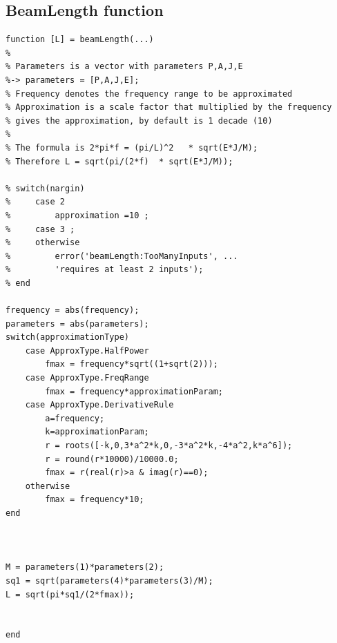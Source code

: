 \documentclass[10pt,a4paper,final]{report}
\begin{document}
\subsection{BeamLength function}

\begin{lstlisting}
function [L] = beamLength(...)
%
% Parameters is a vector with parameters P,A,J,E 
%-> parameters = [P,A,J,E];
% Frequency denotes the frequency range to be approximated
% Approximation is a scale factor that multiplied by the frequency
% gives the approximation, by default is 1 decade (10)
%
% The formula is 2*pi*f = (pi/L)^2   * sqrt(E*J/M);
% Therefore L = sqrt(pi/(2*f)  * sqrt(E*J/M));

% switch(nargin)
%     case 2
%         approximation =10 ;
%     case 3 ;
%     otherwise
%         error('beamLength:TooManyInputs', ...
%         'requires at least 2 inputs');
% end

frequency = abs(frequency);
parameters = abs(parameters);
switch(approximationType)
    case ApproxType.HalfPower
        fmax = frequency*sqrt((1+sqrt(2)));
    case ApproxType.FreqRange
        fmax = frequency*approximationParam;
    case ApproxType.DerivativeRule
        a=frequency;
        k=approximationParam;
        r = roots([-k,0,3*a^2*k,0,-3*a^2*k,-4*a^2,k*a^6]);
        r = round(r*10000)/10000.0;
        fmax = r(real(r)>a & imag(r)==0);        
    otherwise
        fmax = frequency*10;
end


 
M = parameters(1)*parameters(2);
sq1 = sqrt(parameters(4)*parameters(3)/M);
L = sqrt(pi*sq1/(2*fmax));


end
\end{lstlisting}
\newpage
\end{document}
